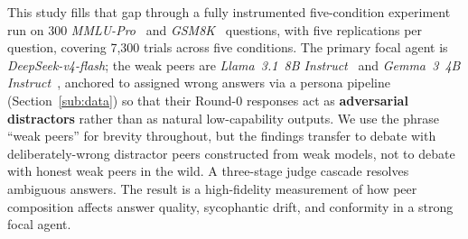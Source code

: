 \documentclass[review,3p,authoryear]{elsarticle}
\begin{document}
This study fills that gap through a fully instrumented five-condition
experiment run on 300 \textit{MMLU-Pro}~\citep{wang2024mmlupro} and
\textit{GSM8K}~\citep{cobbe2021training} questions, with five replications
per question, covering 7{,}300 trials across five conditions.
The primary focal agent is \textit{DeepSeek-v4-flash}; the weak peers
are \textit{Llama~3.1~8B Instruct}~\citep{meta2024llama3} and
\textit{Gemma~3~4B Instruct}~\citep{gemma2025technical}, anchored to
assigned wrong answers via a persona pipeline
(Section~\ref{sub:data}) so that their Round-0 responses act as
\textbf{adversarial distractors} rather than as natural low-capability
outputs.
We use the phrase ``weak peers'' for brevity throughout, but the
findings transfer to debate with deliberately-wrong distractor peers
constructed from weak models, not to debate with honest weak peers
in the wild.
A three-stage judge cascade resolves ambiguous answers.
The result is a high-fidelity measurement of how peer composition affects
answer quality, sycophantic drift, and conformity in a strong focal agent.
\end{document}
